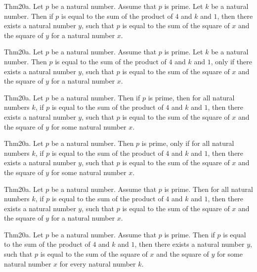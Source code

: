 \documentclass{article}
\begin{document}
Thm20a. Let $p$ be a natural number. Assume that $p$ is prime. Let $k$ be a natural number. Then if $p$ is equal to the sum of the product of $4$ and $k$ and $1$, then there exists a natural number $y$, such that $p$ is equal to the sum of the square of $x$ and the square of $y$ for a natural number $x$.

Thm20a. Let $p$ be a natural number. Assume that $p$ is prime. Let $k$ be a natural number. Then $p$ is equal to the sum of the product of $4$ and $k$ and $1$, only if there exists a natural number $y$, such that $p$ is equal to the sum of the square of $x$ and the square of $y$ for a natural number $x$.

Thm20a. Let $p$ be a natural number. Then if $p$ is prime, then for all natural numbers $k$, if $p$ is equal to the sum of the product of $4$ and $k$ and $1$, then there exists a natural number $y$, such that $p$ is equal to the sum of the square of $x$ and the square of $y$ for some natural number $x$.

Thm20a. Let $p$ be a natural number. Then $p$ is prime, only if for all natural numbers $k$, if $p$ is equal to the sum of the product of $4$ and $k$ and $1$, then there exists a natural number $y$, such that $p$ is equal to the sum of the square of $x$ and the square of $y$ for some natural number $x$.

Thm20a. Let $p$ be a natural number. Assume that $p$ is prime. Then for all natural numbers $k$, if $p$ is equal to the sum of the product of $4$ and $k$ and $1$, then there exists a natural number $y$, such that $p$ is equal to the sum of the square of $x$ and the square of $y$ for a natural number $x$.

Thm20a. Let $p$ be a natural number. Assume that $p$ is prime. Then if $p$ is equal to the sum of the product of $4$ and $k$ and $1$, then there exists a natural number $y$, such that $p$ is equal to the sum of the square of $x$ and the square of $y$ for some natural number $x$ for every natural number $k$.
\end{document}
